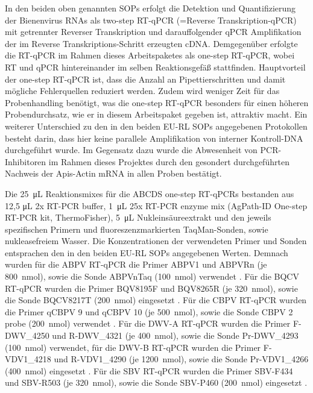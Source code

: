 In den beiden oben genannten SOPs erfolgt die Detektion und Quantifizierung der Bienenvirus RNAs als two-step RT-qPCR (=Reverse Transkription-qPCR) mit getrennter Reverser Transkription und darauffolgender qPCR Amplifikation der im Reverse Transkriptions-Schritt erzeugten cDNA. Demgegenüber erfolgte die RT-qPCR im Rahmen dieses Arbeitspaketes als one-step RT-qPCR, wobei RT und qPCR hintereinander im selben Reaktionsgefäß stattfinden. Hauptvorteil der one-step RT-qPCR ist, dass die Anzahl an Pipettierschritten und damit mögliche Fehlerquellen reduziert werden. Zudem wird weniger Zeit für das Probenhandling benötigt, was die one-step RT-qPCR besonders für einen höheren Probendurchsatz, wie er in diesem Arbeitspaket gegeben ist, attraktiv macht. Ein weiterer Unterschied zu den in den beiden EU-RL SOPs angegebenen Protokollen besteht darin, dass hier keine parallele Amplifikation von interner Kontroll-DNA durchgeführt wurde. Im Gegensatz dazu wurde die Abwesenheit von PCR-Inhibitoren im Rahmen dieses Projektes durch den gesondert durchgeführten Nachweis der Apis-Actin mRNA in allen Proben bestätigt.

Die \SI{25}{\micro\liter} Reaktionsmixes für die ABCDS one-step RT-qPCRs bestanden aus 12,5 \si{\micro\liter} 2x RT-PCR buffer, \SI{1}{\micro\liter} 25x RT-PCR enzyme mix (AgPath-ID One-step RT-PCR kit, ThermoFisher), \SI{5}{\micro\liter} Nukleinsäureextrakt und den jeweils spezifischen Primern und fluoreszenzmarkierten TaqMan-Sonden, sowie nukleasefreiem Wasser. Die Konzentrationen der verwendeten Primer und Sonden entsprachen den in den beiden EU-RL SOPs angegebenen Werten. Demnach wurden für die ABPV RT-qPCR die Primer ABPV1 und ABPVRn (je \SI{800}{\nano\mol}), sowie die Sonde ABPVnTaq (\SI{100}{\nano\mol}) verwendet \citep{jamnikar2012}. Für die BQCV RT-qPCR wurden die Primer BQV8195F und BQV8265R (je \SI{320}{\nano\mol}), sowie die Sonde BQCV8217T (\SI{200}{\nano\mol}) eingesetzt \citep{chantawannakul2006}. Für die CBPV RT-qPCR wurden die Primer qCBPV 9 und qCBPV 10 (je \SI{500}{\nano\mol}), sowie die Sonde CBPV 2 probe (\SI{200}{\nano\mol}) verwendet \citep{blanchard2007}. Für die DWV-A RT-qPCR wurden die Primer F-DWV\_4250 und R-DWV\_4321 (je \SI{400}{\nano\mol}), sowie die Sonde Pr-DWV\_4293 (\SI{100}{\nano\mol}) verwendet, für die DWV-B RT-qPCR wurden die Primer F-VDV1\_4218 und R-VDV1\_4290 (je \SI{1200}{\nano\mol}), sowie die Sonde Pr-VDV1\_4266 (\SI{400}{\nano\mol}) eingesetzt \citep{schurr2019}. Für die SBV RT-qPCR wurden die Primer SBV-F434 und SBV-R503 (je \SI{320}{\nano\mol}), sowie die Sonde SBV-P460 (\SI{200}{\nano\mol}) eingesetzt \citep{blanchard2014}.

